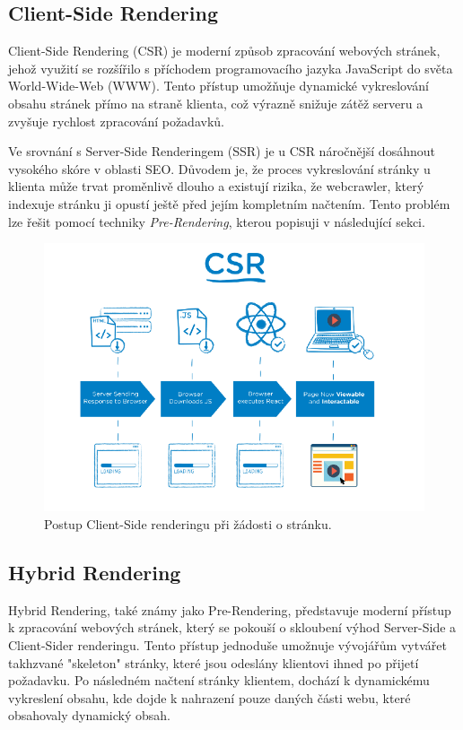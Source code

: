\subsection{Client-Side Rendering}
\label{subsec:dev-request-processing-client-side-rendering}
Client-Side Rendering (CSR) je moderní způsob zpracování webových stránek, jehož využití se rozšířilo s příchodem programovacího jazyka JavaScript do světa World-Wide-Web (WWW). Tento přístup umožňuje dynamické vykreslování obsahu stránek přímo na straně klienta, což výrazně snižuje zátěž serveru a zvyšuje rychlost zpracování požadavků.

Ve srovnání s Server-Side Renderingem (SSR) je u CSR náročnější dosáhnout vysokého skóre v oblasti SEO. Důvodem je, že proces vykreslování stránky u klienta může trvat proměnlivě dlouho a existují rizika, že webcrawler, který indexuje stránku ji opustí ještě před jejím kompletním načtením. Tento problém lze řešit pomocí techniky \textit{Pre-Rendering}, kterou popisuji v následující sekci.

\begin{figure}[H]
    \centering
    \includegraphics[width=1.0\textwidth]{figures/client-side-rendering}
    \caption{Postup Client-Side renderingu při žádosti o stránku. \cite{rendering-diff}}
    \label{fig:client-side-rendering}
\end{figure}

\subsection{Hybrid Rendering}
\label{subsec:dev-request-processing-hybrid-rendering}
Hybrid Rendering, také známy jako Pre-Rendering, představuje moderní přístup k zpracování webových stránek, který se pokouší o skloubení výhod Server-Side a Client-Sider renderingu. Tento přístup jednoduše umožnuje vývojářům vytvářet takhzvané "skeleton" stránky, které jsou odeslány klientovi ihned po přijetí požadavku. Po následném načtení stránky klientem, dochází k dynamickému vykreslení obsahu, kde dojde k nahrazení pouze daných části webu, které obsahovaly dynamický obsah.

